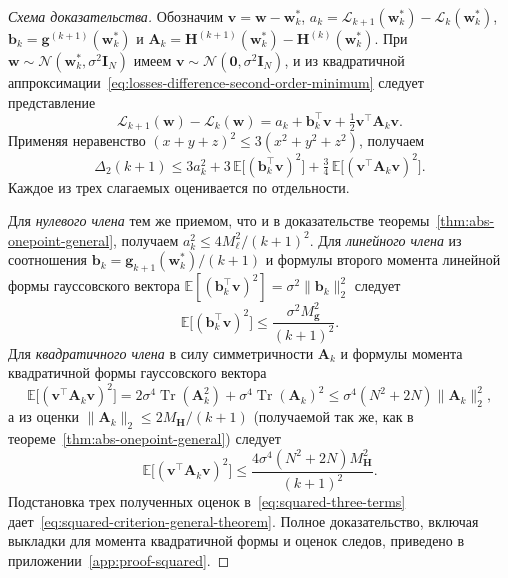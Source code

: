 \begin{proof}[Схема доказательства]
    Обозначим $\mathbf v=\mathbf w-\mathbf w_k^*$, $a_k=\mathcal L_{k+1}(\mathbf w_k^*)-\mathcal L_k(\mathbf w_k^*)$, $\mathbf b_k=\mathbf g^{(k+1)}(\mathbf w_k^*)$ и $\mathbf A_k=\mathbf H^{(k+1)}(\mathbf w_k^*)-\mathbf H^{(k)}(\mathbf w_k^*)$. При $\mathbf w \sim \mathcal N(\mathbf w_k^*, \sigma^2\mathbf I_N)$ имеем $\mathbf v\sim \mathcal N(\mathbf 0,\sigma^2 \mathbf I_N)$, и из квадратичной аппроксимации~\eqref{eq:losses-difference-second-order-minimum} следует представление
    \begin{equation}
        \mathcal L_{k+1}(\mathbf w)-\mathcal L_k(\mathbf w) = a_k+\mathbf b_k^\top \mathbf v+\tfrac12 \mathbf v^\top \mathbf A_k \mathbf v.
    \end{equation}
    Применяя неравенство $(x+y+z)^2 \leqslant 3(x^2+y^2+z^2)$, получаем
    \begin{equation}
        \label{eq:squared-three-terms}
        \Delta_2(k+1) \leqslant 3a_k^2 + 3\,\mathbb E\big[(\mathbf b_k^\top \mathbf v)^2\big] + \tfrac{3}{4}\,\mathbb E\big[(\mathbf v^\top \mathbf A_k \mathbf v)^2\big].
    \end{equation}
    Каждое из трех слагаемых оценивается по отдельности.

    Для \emph{нулевого члена} тем же приемом, что и в доказательстве теоремы~\ref{thm:abs-onepoint-general}, получаем $a_k^2 \leqslant 4M_\ell^2/(k+1)^2$. Для \emph{линейного члена} из соотношения $\mathbf b_k=\mathbf g_{k+1}(\mathbf w_k^*)/(k+1)$ и формулы второго момента линейной формы гауссовского вектора $\mathbb E[(\mathbf b_k^\top \mathbf v)^2]=\sigma^2 \|\mathbf b_k\|_2^2$ следует
    \begin{equation}
        \mathbb E\big[(\mathbf b_k^\top \mathbf v)^2\big] \leqslant \frac{\sigma^2 M_{\mathbf g}^2}{(k+1)^2}.
    \end{equation}
    Для \emph{квадратичного члена} в силу симметричности $\mathbf A_k$ и формулы момента квадратичной формы гауссовского вектора
    \begin{equation}
        \mathbb E\big[(\mathbf v^\top \mathbf A_k \mathbf v)^2\big] = 2\sigma^4 \operatorname{Tr}(\mathbf A_k^2) + \sigma^4 \operatorname{Tr}(\mathbf A_k)^2 \leqslant \sigma^4 (N^2+2N)\|\mathbf A_k\|_2^2,
    \end{equation}
    а из оценки $\|\mathbf A_k\|_2 \leqslant 2M_{\mathbf H}/(k+1)$ (получаемой так же, как в теореме~\ref{thm:abs-onepoint-general}) следует
    \begin{equation}
        \mathbb E\big[(\mathbf v^\top \mathbf A_k \mathbf v)^2\big] \leqslant \frac{4\sigma^4 (N^2+2N)M_{\mathbf H}^2}{(k+1)^2}.
    \end{equation}
    Подстановка трех полученных оценок в~\eqref{eq:squared-three-terms} дает~\eqref{eq:squared-criterion-general-theorem}. Полное доказательство, включая выкладки для момента квадратичной формы и оценок следов, приведено в приложении~\ref{app:proof-squared}.
\end{proof}

